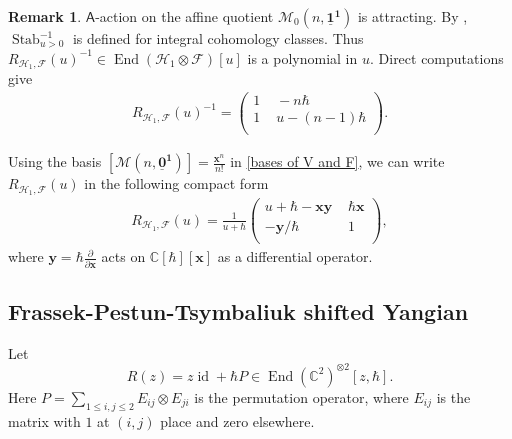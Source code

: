 \documentclass[10pt]{amsart}
\theoremstyle{definition}
\newtheorem{Remark}[Theorem]{Remark}
\numberwithin{equation}{section}
\newcommand{\bC}{\mathbb{C}}
\newcommand{\cM}{\mathcal{M}}
\newcommand{\sA}{\mathsf{A}}
\newcommand{\End}{\operatorname{End}}
\newcommand{\Stab}{\operatorname{Stab}}
\newcommand{\id}{\operatorname{id}}
\begin{document}
\begin{Remark}
$\sA$-action on the affine quotient $\cM_0(n,\underline{\mathbf 1}^{\mathbf 1})$ is attracting. By \cite[Prop.~3.35]{COZZ}, $\Stab_{u>0}^{-1}$ is defined for integral cohomology classes. Thus $R_{\mathcal H_1,\mathcal F}(u)^{-1}\in \End(\mathcal H_1\otimes\mathcal F)[u]$ is a polynomial in $u$. Direct computations give
\begin{align*}
    R_{\mathcal H_1,\mathcal F}(u)^{-1}= \left(
\begin{array}{cc}
 1 & \,\, -n\hbar \\
 1 & \,\,u-(n-1)\hbar \\
\end{array}
\right).
\end{align*}
\end{Remark}
Using the basis $[\cM(n,\underline{\mathbf 0}^{\mathbf 1})]=\frac{\mathbf x^n}{n!}$ in \eqref{bases of V and F}, we can write $R_{\mathcal H_1,\mathcal F}(u)$ in the following compact form
\begin{align}\label{R(H_1,F)}
    R_{\mathcal H_1,\mathcal F}(u)=\frac{1}{u+\hbar}\left(
\begin{array}{cc}
 u+\hbar-\mathbf x\mathbf y & \,\, \hbar\mathbf x \\
 -\mathbf y/\hbar & \,\, 1 \\
\end{array}
\right),
\end{align}
where $\mathbf y=\hbar\frac{\partial}{\partial\mathbf x}$ acts on $\bC[\hbar][\mathbf x]$ as a differential operator.

\subsection{Frassek-Pestun-Tsymbaliuk shifted Yangian}\label{sec yangian action}

Let 
\begin{equation}\label{equ on R(z)}R(z)=z\id+\hbar P\in \End(\bC^2)^{\otimes 2}[z,\hbar]. \end{equation}
Here $P=\sum_{1\leqslant i,j\leqslant 2}E_{ij}\otimes E_{ji}$ is the permutation operator, where $E_{ij}$ is the matrix with $1$ at $(i,j)$ place and zero elsewhere.
\end{document}
